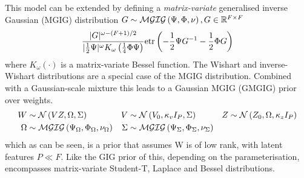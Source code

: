 This model can be extended\cite{Yang2011} by defining a \emph{matrix-variate} generalised inverse Gaussian (MGIG) distribution $G\sim \mathcal{MGIG}\left(\Psi, \Phi, \nu\right), G \in { \mathbb{R}^{F \times F} }$
\begin{align}
\frac{|G|^{\omega - (F + 1)/2}}{|\frac{1}{2} \Psi|^\omega K_\omega \left(\frac{1}{4}\Phi \Psi\right)} \text{etr}\left( -\frac{1}{2} \Psi {G}^{-1} - \frac{1}{2} \Phi G \right)
\end{align}
where $K_\omega(\cdot)$ is a matrix-variate Bessel function. The Wishart and inverse-Wishart distributions are a special case of the MGIG distribution. Combined with a Gaussian-scale mixture this leads to a Gaussian MGIG (GMGIG) prior over weights.
\begin{align}
W & \sim \mathcal{N} \left(VZ, \Omega, \Sigma\right) &
V & \sim \mathcal{N} \left(V_0, \kappa_v I_P, \Sigma\right) &
Z & \sim \mathcal{N} \left(Z_0, \Omega, \kappa_z I_P\right) \\
\Omega & \sim \mathcal{MGIG}\left( \Psi_\Omega, \Phi_\Omega, \nu_\Omega \right) &
\Sigma & \sim \mathcal{MGIG}\left( \Psi_\Sigma, \Phi_\Sigma, \nu_\Sigma \right) &
\end{align}
which as can be seen, is a prior that assumes W is of low rank, with latent features $P \ll F$. Like the GIG prior of this, depending on the parameterisation, encompasses matrix-variate Student-T, Laplace and Bessel distributions. 






